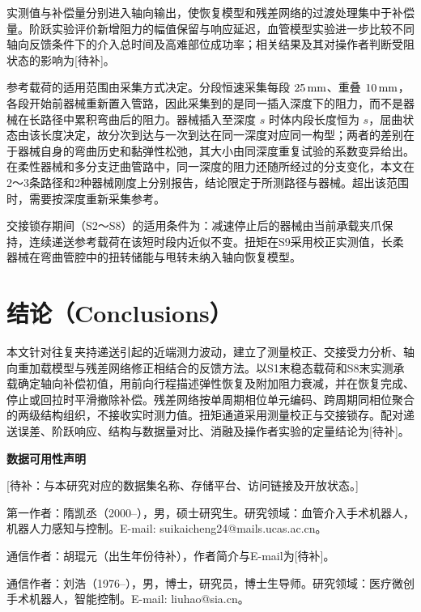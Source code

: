 \documentclass{JQRnew}
\providecommand{\RevisionColor}{\color{black}}
\newcommand{\revbegin}{\begingroup\RevisionColor}
\newcommand{\revend}{\par\endgroup}
\begin{document}
\revbegin
实测值与补偿量分别进入轴向输出，使恢复模型和残差网络的过渡处理集中于补偿量。阶跃实验评价新增阻力的幅值保留与响应延迟，血管模型实验进一步比较不同轴向反馈条件下的介入总时间及高难部位成功率；相关结果及其对操作者判断受阻状态的影响为[待补]。
\revend

\revbegin
参考载荷的适用范围由采集方式决定。分段恒速采集每段 $25\,{\rm mm}$、重叠 $10\,{\rm mm}$，各段开始前器械重新置入管路，因此采集到的是同一插入深度下的阻力，而不是器械在长路径中累积弯曲后的阻力。器械插入至深度 $s$ 时体内段长度恒为 $s$，屈曲状态由该长度决定，故分次到达与一次到达在同一深度对应同一构型；两者的差别在于器械自身的弯曲历史和黏弹性松弛，其大小由同深度重复试验的系数变异给出。在柔性器械和多分支迂曲管路中，同一深度的阻力还随所经过的分支变化，本文在2～3条路径和2种器械刚度上分别报告，结论限定于所测路径与器械。超出该范围时，需要按深度重新采集参考。
\revend

\revbegin
交接锁存期间（S2～S8）的适用条件为：减速停止后的器械由当前承载夹爪保持，连续递送参考载荷在该短时段内近似不变。扭矩在S9采用校正实测值，长柔器械在弯曲管腔中的扭转储能与甩转未纳入轴向恢复模型。
\revend

\section{结论（Conclusions）}

\revbegin
本文针对往复夹持递送引起的近端测力波动，建立了测量校正、交接受力分析、轴向重加载模型与残差网络修正相结合的反馈方法。以S1末稳态载荷和S8末实测承载确定轴向补偿初值，用前向行程描述弹性恢复及附加阻力衰减，并在恢复完成、停止或回拉时平滑撤除补偿。残差网络按单周期相位单元编码、跨周期同相位聚合的两级结构组织，不接收实时测力值。扭矩通道采用测量校正与交接锁存。配对递送误差、阶跃响应、结构与数据量对比、消融及操作者实验的定量结论为[待补]。
\revend

\noindent
\textbf{数据可用性声明}

\revbegin
[待补：与本研究对应的数据集名称、存储平台、访问链接及开放状态。]
\revend




\begin{AuthorIntroduction}
\Intro 第一作者：隋凯丞（2000--），男，硕士研究生。研究领域：血管介入手术机器人，机器人力感知与控制。E-mail: suikaicheng24@mails.ucas.ac.cn。
\revbegin

\Intro
通信作者：胡琨元（出生年份待补），作者简介与E-mail为[待补]。
\revend

\Intro 通信作者：刘浩（1976--），男，博士，研究员，博士生导师。研究领域：医疗微创手术机器人，智能控制。E-mail: liuhao@sia.cn。

\end{AuthorIntroduction}

\balance
\end{document}
